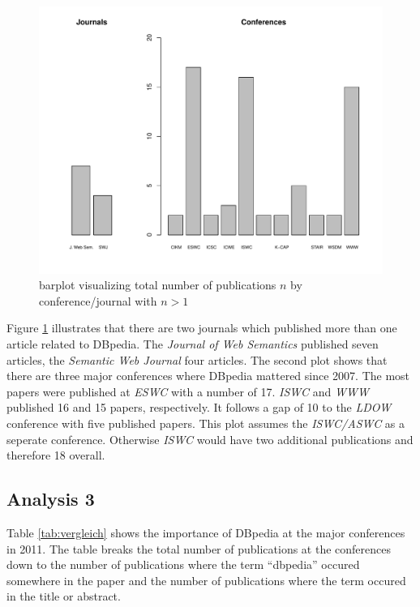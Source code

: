 \documentclass[english]{lni}
\begin{document}
\begin{figure}[htb]
\centering
\includegraphics[height=0.8\textwidth]{auswertung2.pdf}
\caption{\label{fig:auswertung2}barplot visualizing total number of publications $n$ by conference/journal with $n > 1$}
\end{figure}

   Figure \ref{fig:auswertung2} illustrates that there are two journals which published
   more than one article related to DBpedia. The \emph{Journal of Web Semantics}
   published seven articles, the \emph{Semantic Web Journal} four articles. The
   second plot shows that there are three major conferences where DBpedia
   mattered since 2007. The most papers were published at \emph{ESWC} with a number
   of 17. \emph{ISWC} and \emph{WWW} published 16 and 15 papers, respectively. It follows
   a gap of 10 to the \emph{LDOW} conference with five published papers. This plot
   assumes the \emph{ISWC/ASWC} as a seperate conference. Otherwise \emph{ISWC} would have
   two additional publications and therefore 18 overall.
   
\subsection{Analysis 3}
\label{sec-3-3}


   Table \ref{tab:vergleich} shows the importance of DBpedia at the major
   conferences in 2011. The table breaks the total number of publications at the
   conferences down to the number of publications where the term ``dbpedia''
   occured somewhere in the paper and the number of publications where the term
   occured in the title or abstract.
\end{document}
